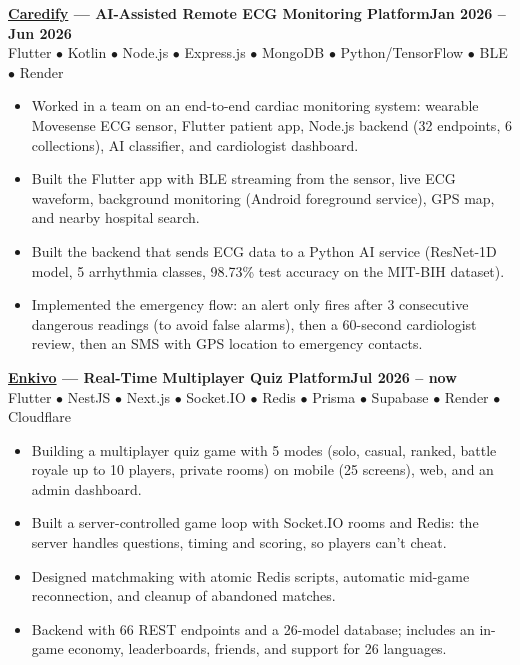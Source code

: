 \documentclass[10pt,a4paper]{article}
\newcommand{\entry}[3]{%
  \vspace{4pt}
  \textbf{#1}\hfill\textbf{#2}\\
  {\small #3}\par
}
\begin{document}
\entry{\href{https://www.linkedin.com/company/caredify-396/posts/?feedView=all}{Caredify} --- AI-Assisted Remote ECG Monitoring Platform}{Jan 2026 -- Jun 2026}
{Flutter $\bullet$ Kotlin $\bullet$ Node.js $\bullet$ Express.js $\bullet$ MongoDB $\bullet$ Python/TensorFlow $\bullet$ BLE $\bullet$ Render}
\begin{itemize}
  \item Worked in a team on an end-to-end cardiac monitoring system: wearable Movesense ECG sensor, Flutter patient app, Node.js backend (32 endpoints, 6 collections), AI classifier, and cardiologist dashboard.
  \item Built the Flutter app with BLE streaming from the sensor, live ECG waveform, background monitoring (Android foreground service), GPS map, and nearby hospital search.
  \item Built the backend that sends ECG data to a Python AI service (ResNet-1D model, 5 arrhythmia classes, 98.73\% test accuracy on the MIT-BIH dataset).
  \item Implemented the emergency flow: an alert only fires after 3 consecutive dangerous readings (to avoid false alarms), then a 60-second cardiologist review, then an SMS with GPS location to emergency contacts.
\end{itemize}

\entry{\href{https://soufyanrachdi.vercel.app/projects/enkivo}{Enkivo} --- Real-Time Multiplayer Quiz Platform}{Jul 2026 -- now}
{Flutter $\bullet$ NestJS $\bullet$ Next.js $\bullet$ Socket.IO $\bullet$ Redis $\bullet$ Prisma $\bullet$ Supabase $\bullet$ Render $\bullet$ Cloudflare}
\begin{itemize}
  \item Building a multiplayer quiz game with 5 modes (solo, casual, ranked, battle royale up to 10 players, private rooms) on mobile (25 screens), web, and an admin dashboard.
  \item Built a server-controlled game loop with Socket.IO rooms and Redis: the server handles questions, timing and scoring, so players can't cheat.
  \item Designed matchmaking with atomic Redis scripts, automatic mid-game reconnection, and cleanup of abandoned matches.
  \item Backend with 66 REST endpoints and a 26-model database; includes an in-game economy, leaderboards, friends, and support for 26 languages.
\end{itemize}
\end{document}
